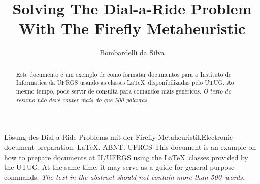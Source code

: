 \documentclass[tuberlin,cic,tc,openright,english,noabntcite,oneside]{iiufrgs}
\title{Solving The Dial-a-Ride Problem With The Firefly Metaheuristic}
\author{Bombardelli da Silva}{Fernando}
\begin{document}
\maketitle





\begin{abstract}
    Este documento é um exemplo de como formatar documentos para o
    Instituto de Informática da UFRGS usando as classes \LaTeX\
    disponibilizadas pelo UTUG\@. Ao mesmo tempo, pode servir de consulta
    para comandos mais genéricos. \emph{O texto do resumo não deve
      conter mais do que 500 palavras.}
\end{abstract}

\begin{englishabstract}{Lösung des Dial-a-Ride-Problems mit der Firefly Metaheuristik}{Electronic document preparation. \LaTeX. ABNT. UFRGS}
    This document is an example on how to prepare documents at II/UFRGS
    using the \LaTeX\ classes provided by the UTUG\@. At the same time, it
    may serve as a guide for general-purpose commands. \emph{The text in
      the abstract should not contain more than 500~words.}
\end{englishabstract}

\listoffigures

\listoftables
\end{document}
